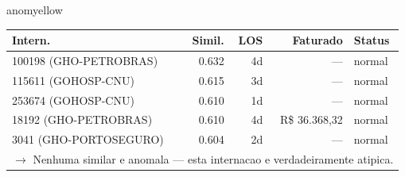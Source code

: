 \documentclass[a4paper,10pt]{article}
\begin{document}
\begin{anomalycard}[Internacao 166085 | GHO-PETROBRAS | MODERADO (z=2.19)]{anomyellow}
\begin{tabular}{l r r r l}\toprule\textbf{Intern.} & \textbf{Simil.} & \textbf{LOS} & \textbf{Faturado} & \textbf{Status} \\\midrule
100198 (GHO-PETROBRAS) & 0.632 & 4d & --- & \textcolor{jcubeblue}{normal} \\
115611 (GOHOSP-CNU) & 0.615 & 3d & --- & \textcolor{jcubeblue}{normal} \\
253674 (GOHOSP-CNU) & 0.610 & 1d & --- & \textcolor{jcubeblue}{normal} \\
18192 (GHO-PETROBRAS) & 0.610 & 4d & R\$ 36.368,32 & \textcolor{jcubeblue}{normal} \\
3041 (GHO-PORTOSEGURO) & 0.604 & 2d & --- & \textcolor{jcubeblue}{normal} \\
\multicolumn{5}{l}{\textcolor{jcubeblue}{\small $\rightarrow$ Nenhuma similar e anomala --- esta internacao e verdadeiramente atipica.}} \\
\bottomrule\end{tabular}


\end{anomalycard}

\newpage
\end{document}
